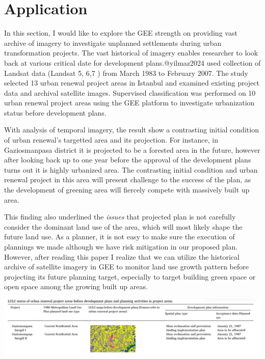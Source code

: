 \documentclass[
  letterpaper,
  DIV=11,
  numbers=noendperiod]{scrreprt}
\begin{document}
\hypertarget{application-3}{%
\section{Application}\label{application-3}}

In this section, I would like to explore the GEE strength on providing
vast archive of imagery to investigate unplanned settlements during
urban transformation projects. The vast historical of imagery enables
researcher to look back at various critical date for development
plans.@yilmaz2024 used collection of Landsat data (Landsat 5, 6,7 ) from
March 1983 to February 2007. The study selected 13 urban renewal project
areas in Istanbul and examined existing project data and archival
satellite images. Supervised classification was performed on 10 urban
renewal project areas using the GEE platform to investigate urbanization
status before development plans.

With analysis of temporal imagery, the result show a contrasting initial
condition of urban renewal's targetted area and its projection. For
instance, in Gaziosmanpasa district it is projected to be a forested
area in the future, however after looking back up to one year before the
approval of the development plans turns out it is highly urbanized area.
The contrasting initial condition and urban renewal project in this area
will present challenge to the success of the plan, as the development of
greening area will fiercely compete with massively built up area.

This finding also underlined the \emph{issues} that projected plan is
not carefully consider the dominant land use of the area, which will
most likely shape the future land use. As a planner, it is not easy to
make sure the execution of plannings we made although we have risk
mitigation in our proposed plan. However, after reading this paper I
realize that we can utilize the historical archive of satellite imagery
in GEE to monitor land use growth pattern before projecting its future
planning target, especially to target building green space or open space
among the growing built up areas.

\includegraphics[width=7.58333in,height=\textheight]{images/clipboard-3598015637.png}
\end{document}
